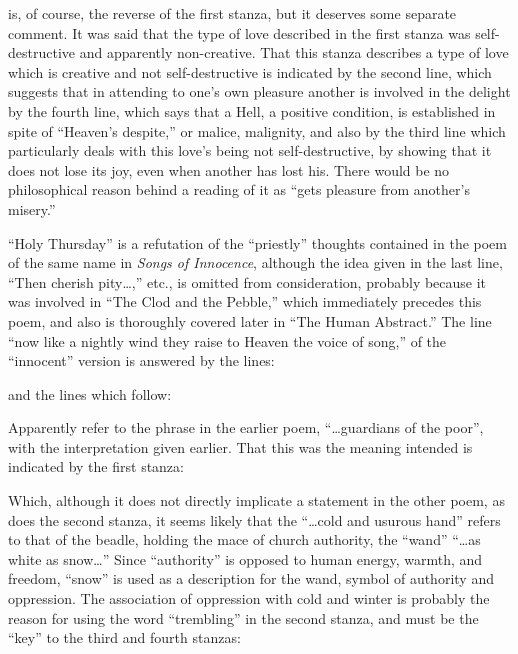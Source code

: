 \noindent is, of course, the reverse of the first stanza, but it deserves some separate comment. It was said that
the type of love described in the first stanza was self-destructive and apparently non-creative. That this stanza
describes a type of love which is creative and not self-destructive is indicated by the second line, which suggests
that in attending to one's own pleasure another is involved in the delight by the fourth line, which says that
a Hell, a positive condition, is established in spite of \enquote{Heaven's despite,} or malice, malignity, and also
by the third line which particularly deals with this love's being not self-destructive, by showing that it does
not lose its joy, even when another has lost his. There would be no philosophical reason behind a reading of it as \enquote{gets
pleasure from another's misery.}

\enquote{Holy Thursday} is a refutation of the \enquote{priestly} thoughts contained in the poem of the
same name in \emph{Songs of Innocence}, although the idea given in the last line, \enquote{Then cherish pity\dots,} etc., is omitted from consideration,
probably because it was involved in \enquote{The Clod and the Pebble,} which immediately precedes this poem, and also is thoroughly
covered later in \enquote{The Human Abstract.} The line \enquote{now like a nightly wind they raise to Heaven the voice of song,} of the \enquote{innocent}
version is answered by the lines:

	
\noindent and the lines which follow: 


Apparently refer to the phrase in the earlier poem, \enquote{\dots guardians of the poor},
with the interpretation given earlier. That this was the meaning intended is indicated by the
first stanza:


Which, although it does not directly implicate a statement in the other poem, as does the second stanza, it
seems likely that the \enquote{\dots cold and usurous hand} refers to that of the beadle, holding
the mace of church authority, the \enquote{wand} \enquote{\dots as white as snow\dots} Since \enquote{authority} is opposed to human
energy, warmth, and freedom, \enquote{snow} is used as a description for the wand, symbol of authority and oppression.
The association of oppression with cold and winter is probably the reason for using the word \enquote{trembling} in the
second stanza, and must be the \enquote{key} to the third and fourth stanzas:

